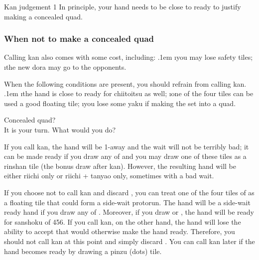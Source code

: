 \bigskip
\begin{itembox}[c]{{\jap Kan} judgement 1}
In principle, your hand needs to be close to ready to justify making a concealed quad. 
\end{itembox}

\subsubsection{When not to make a concealed quad}

Calling {\jap kan} also comes with some cost, including:
\bi \itemsep.1em
\i you may lose safety tiles;
\i the new {\jap dora} may go to the opponents.
\ei

When the following conditions are present, you should refrain from calling {\jap kan}.
\bi \itemsep.1em
\i the hand is close to ready for {\jap chiitoitsu} as well;
\i one of the four tiles can be used a good floating tile;
\i you lose some {\jap yaku} if making the set into a quad.
\ei

\bigskip
\begin{itembox}[r]{Concealed quad?}
\bp
{}\\
\ep{}
\vspace{-5pt}It is your turn. What would you do?
\end{itembox}

\bigskip
If you call {\jap kan}, the hand will be 1-away and the wait will not be terribly bad; it can be made ready if you draw any of  and you may draw one of these tiles as a {\jap rinshan} tile (the bonus draw after {\jap kan}). However, the resulting hand will be either riichi only or riichi + {\jap tanyao} only, sometimes with a bad wait. 

\bigskip
If you choose not to call {\jap kan} and discard {\LARGE{}}, you can treat one of the four tiles of {\LARGE{}} as a floating tile that could form a side-wait protorun. The hand will be a side-wait ready hand if you draw any of {\LARGE{}}. Moreover, if you draw {\LARGE{}} or {\LARGE{}}, the hand will be ready for {\jap sanshoku} of 456. 
If you call {\jap kan}, on the other hand, the hand will lose the ability to accept {\LARGE{}} that would otherwise make the hand ready.
Therefore, you should not call {\jap kan} at this point and simply discard {\LARGE{}}. You can call {\jap kan} later if the hand becomes ready by drawing a {\jap pinzu} (dots) tile.

